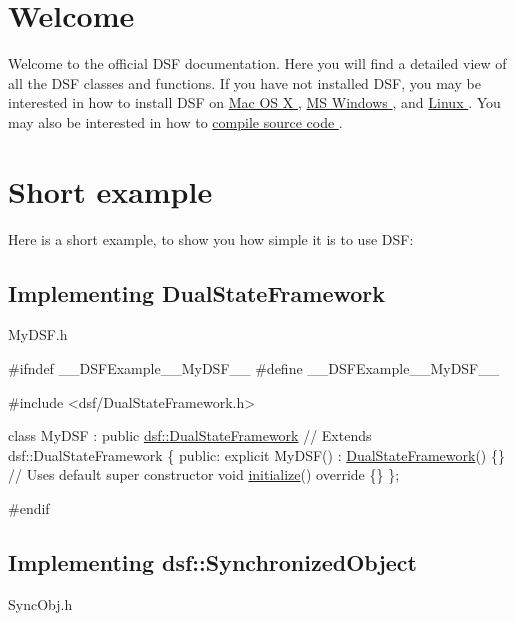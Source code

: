 \hypertarget{index_welcome}{}\section{Welcome}\label{index_welcome}
Welcome to the official D\+S\+F documentation. Here you will find a detailed view of all the D\+S\+F classes and functions. If you have not installed D\+S\+F, you may be interested in how to install D\+S\+F on \hyperlink{_installation_Mac}{Mac O\+S X }, \hyperlink{_installation_Win}{M\+S Windows }, and \hyperlink{_installation_Linux}{Linux }. You may also be interested in how to \hyperlink{_installation_source}{compile source code }.\hypertarget{index_example}{}\section{Short example}\label{index_example}
Here is a short example, to show you how simple it is to use D\+S\+F\+: \hypertarget{index_dsf}{}\subsection{Implementing Dual\+State\+Framework}\label{index_dsf}
My\+D\+S\+F.\+h 
\begin{DoxyCodeInclude}
\textcolor{preprocessor}{#ifndef \_\_DSFExample\_\_MyDSF\_\_}
\textcolor{preprocessor}{#define \_\_DSFExample\_\_MyDSF\_\_}

\textcolor{preprocessor}{#include <dsf/DualStateFramework.h>}

\textcolor{keyword}{class }MyDSF : \textcolor{keyword}{public} \hyperlink{classdsf_1_1_dual_state_framework}{dsf::DualStateFramework} \textcolor{comment}{// Extends dsf::DualStateFramework}
\{
\textcolor{keyword}{public}:
    \textcolor{keyword}{explicit} MyDSF() : \hyperlink{namespacedsf_a68ac3b6a0526bfa7f6a412918afb1841}{DualStateFramework}() \{\} \textcolor{comment}{// Uses default super constructor}
    \textcolor{keywordtype}{void} \hyperlink{classdsf_1_1_dual_state_framework_a809a7bba4148e17ea9a43a0a035383ba}{initialize}()\textcolor{keyword}{ override }\{\}
\};

\textcolor{preprocessor}{#endif}
\end{DoxyCodeInclude}
\hypertarget{index_syncObj}{}\subsection{Implementing dsf\+::\+Synchronized\+Object}\label{index_syncObj}
Sync\+Obj.\+h 

